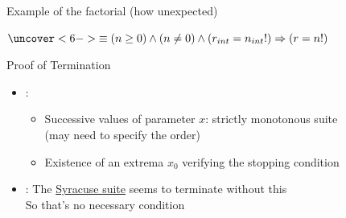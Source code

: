 \begin{frame}{Example of the factorial (how unexpected)}
\begin{itemize}
    $\uncover<6->{\equiv(n\geq 0)\wedge (n\neq 0)\wedge (r_{int}=n_{int}!) \Rightarrow (r=n!)}$

    \medskip
  \end{itemize}
\end{frame}

\begin{frame}{Proof of Termination}
  \begin{itemize}
  \item {}:
    \begin{itemize}
    \item Successive values of parameter $x$: \alert{strictly monotonous suite}\\ 
      (may need to specify the order)
    \item Existence of an \alert{extrema} $x_0$ \alert{verifying the
        stopping condition}
    \end{itemize}
  \item {}: The \hyperlink{syracuse}{Syracuse suite} seems 
    to terminate without this\\
    So that's no necessary condition\bigskip 

  \end{itemize}
\end{frame}
